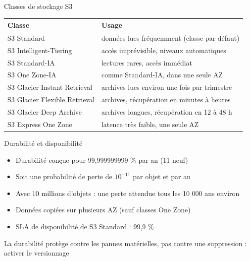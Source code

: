 \begin{frame}{Classes de stockage S3}
  \renewcommand{\arraystretch}{1.12}
  \begin{tabularx}{\textwidth}{@{}>{\raggedright\arraybackslash}p{5.4cm}>{\raggedright\arraybackslash}X@{}}
    \toprule
    \textbf{Classe} & \textbf{Usage} \\ \midrule
    S3 Standard & données lues fréquemment (classe par défaut) \\
    S3 Intelligent-Tiering & accès imprévisible, niveaux automatiques \\
    S3 Standard-IA & lectures rares, accès immédiat \\
    S3 One Zone-IA & comme Standard-IA, dans une seule AZ \\
    S3 Glacier Instant Retrieval & archives lues environ une fois par trimestre \\
    S3 Glacier Flexible Retrieval & archives, récupération en minutes à heures \\
    S3 Glacier Deep Archive & archives longues, récupération en 12 à 48 h \\
    S3 Express One Zone & latence très faible, une seule AZ \\ \bottomrule
  \end{tabularx}
\end{frame}

\begin{frame}{Durabilité et disponibilité}
  \begin{itemize}
    \setlength{\itemsep}{.55em}
    \item Durabilité conçue pour 99,999999999 \% par an (11 neuf)
    \item Soit une probabilité de perte de \(10^{-11}\) par objet et par an
    \item Avec 10 millions d'objets : une perte attendue tous les 10 000 ans environ
    \item Données copiées sur plusieurs AZ (sauf classes One Zone)
    \item SLA de disponibilité de S3 Standard : 99,9 \%
  \end{itemize}
  \bigskip
  \attention La durabilité protège contre les pannes matérielles, pas contre une suppression : activer le versionnage
\end{frame}

